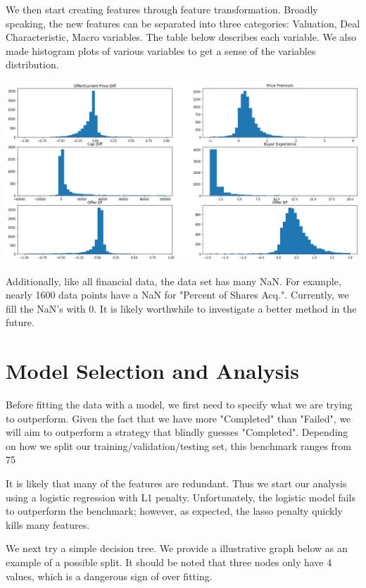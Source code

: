 \documentclass[a4paper]{article}
\begin{document}
We then start creating features through feature transformation. Broadly speaking, the new features can be separated into three categories: Valuation, Deal Characteristic, Macro variables. The table below describes each variable. We also made histogram plots of various variables to get a sense of the variables distribution.


\begin{center}
\includegraphics[scale=0.3]{hist.png} 
\end{center}

Additionally, like all financial data, the data set has many NaN. For example, nearly 1600 data points have a NaN for "Percent of Shares Acq.". Currently, we fill the NaN's with 0. It is likely worthwhile to investigate a better method in the future.


\section{Model Selection and Analysis }
\label{sec:model}

Before fitting the data with a model, we first need to specify what we are trying to outperform. Given the fact that we have more "Completed" than "Failed", we will aim to outperform a strategy that blindly guesses "Completed". Depending on how we split our training/validation/testing set, this benchmark ranges from 75%

It is likely that many of the features are redundant. Thus we start our analysis using a logistic regression with L1 penalty. Unfortunately, the logistic model fails to outperform the benchmark; however, as expected, the lasso penalty quickly kills many features.

We next try a simple decision tree. We provide a illustrative graph below as an example of a possible split. It should be noted that three nodes only have 4 values, which is a dangerous sign of over fitting. 
\end{document}
